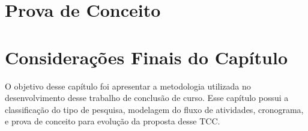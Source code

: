 \begin{table}[H]
\centering
{}
\caption{Cronograma TCC 2}
\label{my-label}
\end{table}

\section{Prova de Conceito}
\label{sec:provaconceito}


\section{Considerações Finais do Capítulo}

O objetivo desse capítulo foi apresentar a metodologia utilizada no desenvolvimento
desse trabalho de conclusão de curso. Esse capítulo possui a classificação do tipo
de pesquisa, modelagem do fluxo de atividades, cronograma, e prova de conceito para
evolução da proposta desse TCC.
